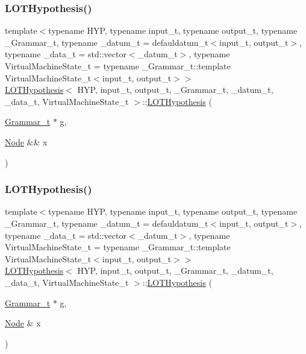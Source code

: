 \subsubsection{\texorpdfstring{L\+O\+T\+Hypothesis()}{LOTHypothesis()}\hspace{0.1cm}{\footnotesize\ttfamily [2/4]}}
{\footnotesize\ttfamily template$<$typename H\+YP, typename input\+\_\+t, typename output\+\_\+t, typename \+\_\+\+Grammar\+\_\+t, typename \+\_\+datum\+\_\+t = defauldatum\+\_\+t$<$input\+\_\+t, output\+\_\+t$>$, typename \+\_\+data\+\_\+t = std\+::vector$<$\+\_\+datum\+\_\+t$>$, typename Virtual\+Machine\+State\+\_\+t = typename \+\_\+\+Grammar\+\_\+t\+::template Virtual\+Machine\+State\+\_\+t$<$input\+\_\+t, output\+\_\+t$>$$>$ \\
\hyperlink{class_l_o_t_hypothesis}{L\+O\+T\+Hypothesis}$<$ H\+YP, input\+\_\+t, output\+\_\+t, \+\_\+\+Grammar\+\_\+t, \+\_\+datum\+\_\+t, \+\_\+data\+\_\+t, Virtual\+Machine\+State\+\_\+t $>$\+::\hyperlink{class_l_o_t_hypothesis}{L\+O\+T\+Hypothesis} (\begin{DoxyParamCaption}\item[{\hyperlink{class_l_o_t_hypothesis_a8006204013d471860e54c49d19edbace}{Grammar\+\_\+t} $\ast$}]{g,  }\item[{\hyperlink{class_node}{Node} \&\&}]{x }\end{DoxyParamCaption})\hspace{0.3cm}{\ttfamily [inline]}}

\mbox{\label{class_l_o_t_hypothesis_a877ff1340bdf69fa2d9ed290c70f1cfb}} 
\subsubsection{\texorpdfstring{L\+O\+T\+Hypothesis()}{LOTHypothesis()}\hspace{0.1cm}{\footnotesize\ttfamily [3/4]}}
{\footnotesize\ttfamily template$<$typename H\+YP, typename input\+\_\+t, typename output\+\_\+t, typename \+\_\+\+Grammar\+\_\+t, typename \+\_\+datum\+\_\+t = defauldatum\+\_\+t$<$input\+\_\+t, output\+\_\+t$>$, typename \+\_\+data\+\_\+t = std\+::vector$<$\+\_\+datum\+\_\+t$>$, typename Virtual\+Machine\+State\+\_\+t = typename \+\_\+\+Grammar\+\_\+t\+::template Virtual\+Machine\+State\+\_\+t$<$input\+\_\+t, output\+\_\+t$>$$>$ \\
\hyperlink{class_l_o_t_hypothesis}{L\+O\+T\+Hypothesis}$<$ H\+YP, input\+\_\+t, output\+\_\+t, \+\_\+\+Grammar\+\_\+t, \+\_\+datum\+\_\+t, \+\_\+data\+\_\+t, Virtual\+Machine\+State\+\_\+t $>$\+::\hyperlink{class_l_o_t_hypothesis}{L\+O\+T\+Hypothesis} (\begin{DoxyParamCaption}\item[{\hyperlink{class_l_o_t_hypothesis_a8006204013d471860e54c49d19edbace}{Grammar\+\_\+t} $\ast$}]{g,  }\item[{\hyperlink{class_node}{Node} \&}]{x }\end{DoxyParamCaption})\hspace{0.3cm}{\ttfamily [inline]}}

